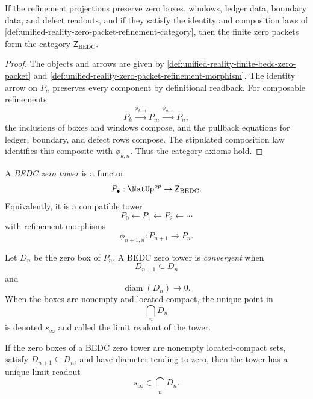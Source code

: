 \begin{theorem}
\label{thm:unified-reality-refinement-packets-form-category}
If the refinement projections preserve zero boxes, windows, ledger
data, boundary data, and defect readouts, and if they satisfy the
identity and composition laws of
\autoref{def:unified-reality-zero-packet-refinement-category}, then the
finite zero packets form the category $\mathsf Z_{\mathrm{BEDC}}$.
\end{theorem}

\begin{proof}
The objects and arrows are given by
\autoref{def:unified-reality-finite-bedc-zero-packet} and
\autoref{def:unified-reality-zero-packet-refinement-morphism}.  The
identity arrow on $P_n$ preserves every component by definitional
readback.  For composable refinements
$$
P_k\xrightarrow{\phi_{k,m}}P_m\xrightarrow{\phi_{m,n}}P_n,
$$
the inclusions of boxes and windows compose, and the pullback equations
for ledger, boundary, and defect rows compose.  The stipulated
composition law identifies this composite with $\phi_{k,n}$.  Thus the
category axioms hold.
\end{proof}

\begin{definition}
\label{def:unified-reality-bedc-zero-tower}
A \emph{BEDC zero tower} is a functor
$$
P_{\bullet}:{\NatUp}^{op}\to\mathsf Z_{\mathrm{BEDC}}.
$$
Equivalently, it is a compatible tower
$$
P_0\leftarrow P_1\leftarrow P_2\leftarrow\cdots
$$
with refinement morphisms
$$
\phi_{n+1,n}:P_{n+1}\to P_n.
$$
\end{definition}

\begin{definition}
\label{def:unified-reality-convergent-zero-tower}
Let $D_n$ be the zero box of $P_n$.  A BEDC zero tower is
\emph{convergent} when
$$
D_{n+1}\subseteq D_n
$$
and
$$
\operatorname{diam}(D_n)\to0.
$$
When the boxes are nonempty and located-compact, the unique point in
$$
\bigcap_n D_n
$$
is denoted $s_{\infty}$ and called the limit readout of the tower.
\end{definition}

\begin{theorem}
\label{thm:unified-reality-nested-zero-boxes-unique-limit-readout}
If the zero boxes of a BEDC zero tower are nonempty located-compact
sets, satisfy $D_{n+1}\subseteq D_n$, and have diameter tending to zero,
then the tower has a unique limit readout
$$
s_{\infty}\in\bigcap_nD_n.
$$
\end{theorem}

